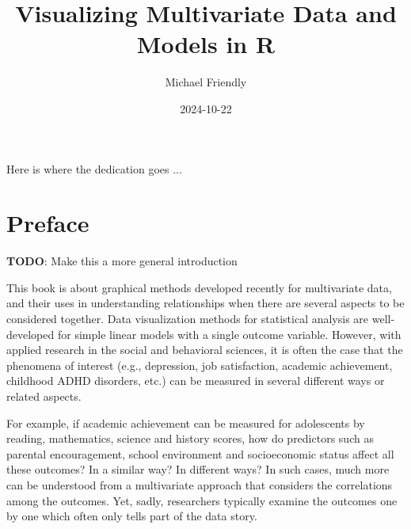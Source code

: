 \documentclass[
  letterpaper,
  10pt,
  krantz2]{krantz}
\title{Visualizing Multivariate Data and Models in R}
\author{Michael Friendly}
\date{2024-10-22}
\renewcommand*\contentsname{Table of contents}
\newcommand\contentsname{Table of contents}
\begin{document}
\maketitle


\thispagestyle{empty}

\begin{center}
Here is where the dedication goes ...
\end{center}

\setlength{\abovedisplayskip}{-5pt}
\setlength{\abovedisplayshortskip}{-5pt}


\renewcommand*\contentsname{Table of contents}
{
\hypersetup{linkcolor=}
\setcounter{tocdepth}{2}
\tableofcontents
}


\chapter*{Preface}\label{preface}


\textbf{TODO}: Make this a more general introduction

This book is about graphical methods developed recently for multivariate
data, and their uses in understanding relationships when there are
several aspects to be considered together. Data visualization methods
for statistical analysis are well-developed for simple linear models
with a single outcome variable. However, with applied research in the
social and behavioral sciences, it is often the case that the phenomena
of interest (e.g., depression, job satisfaction, academic achievement,
childhood ADHD disorders, etc.) can be measured in several different
ways or related aspects.

For example, if academic achievement can be measured for adolescents by
reading, mathematics, science and history scores, how do predictors such
as parental encouragement, school environment and socioeconomic status
affect all these outcomes? In a similar way? In different ways? In such
cases, much more can be understood from a multivariate approach that
considers the correlations among the outcomes. Yet, sadly, researchers
typically examine the outcomes one by one which often only tells part of
the data story.
\end{document}
